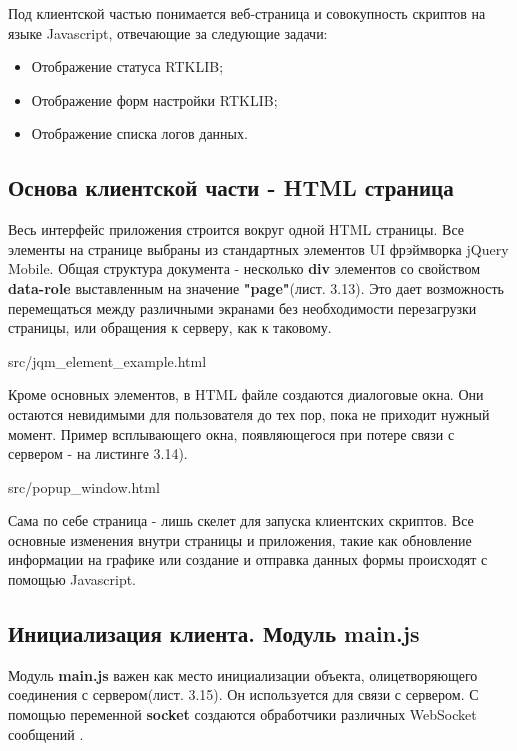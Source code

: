Под клиентской частью понимается веб-страница и совокупность скриптов на языке Javascript, отвечающие за следующие задачи:

\begin{itemize}
  \item Отображение статуса RTKLIB;
  \item Отображение форм настройки RTKLIB;
  \item Отображение списка логов данных.
\end{itemize}

\subsection{Основа клиентской части - HTML страница} \label{subsect3_2_1}

Весь интерфейс приложения строится вокруг одной HTML страницы. Все элементы на странице выбраны из стандартных элементов UI фрэймворка jQuery Mobile. Общая структура документа - несколько \textbf{div} элементов со свойством \textbf{data-role} выставленным на значение \textbf{"page"}(лист. 3.13). Это дает возможность перемещаться между различными экранами без необходимости перезагрузки страницы, или обращения к серверу, как к таковому.


{src/jqm_element_example.html}

Кроме основных элементов, в HTML файле создаются диалоговые окна. Они остаются невидимыми для пользователя до тех пор, пока не приходит нужный момент. Пример всплывающего окна, появляющегося при потере связи с сервером - на листинге 3.14).


{src/popup_window.html}

Сама по себе страница - лишь скелет для запуска клиентских скриптов. Все основные изменения внутри страницы и приложения, такие как обновление информации на графике или создание и отправка данных формы происходят с помощью Javascript.

\subsection{Инициализация клиента. Модуль main.js} \label{subsect3_2_2}

Модуль \textbf{main.js} важен как место инициализации объекта, олицетворяющего соединения с сервером(лист. 3.15). Он используется для связи с сервером. С помощью переменной \textbf{socket} создаются обработчики различных WebSocket сообщений \cite{socketio-docs}.

